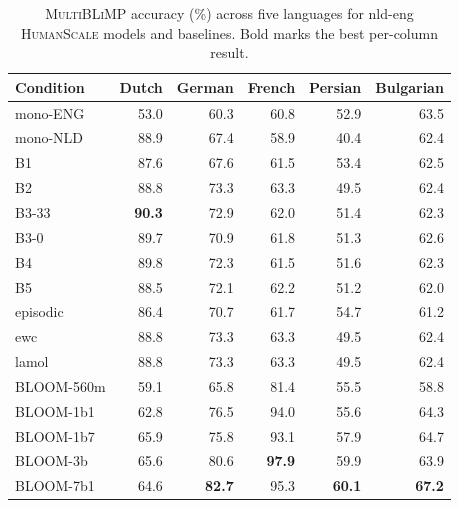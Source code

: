 \begin{table}[t]
  \centering
  \small
  \caption{\textsc{MultiBLiMP} accuracy (\%) across five languages for nld-eng \textsc{HumanScale} \beetle{} models and baselines. Bold marks the best per-column result.}
  \label{tab:multiblimp}
  \begin{tabular}{lrrrrr}
    \toprule
    Condition & Dutch & German & French & Persian & Bulgarian \\
    \midrule
    mono-ENG & 53.0 & 60.3 & 60.8 & 52.9 & 63.5 \\
    mono-NLD & 88.9 & 67.4 & 58.9 & 40.4 & 62.4 \\
    B1       & 87.6 & 67.6 & 61.5 & 53.4 & 62.5 \\
    B2       & 88.8 & 73.3 & 63.3 & 49.5 & 62.4 \\
    B3-33    & \textbf{90.3} & 72.9 & 62.0 & 51.4 & 62.3 \\
    B3-0     & 89.7 & 70.9 & 61.8 & 51.3 & 62.6 \\
    B4       & 89.8 & 72.3 & 61.5 & 51.6 & 62.3 \\
    B5       & 88.5 & 72.1 & 62.2 & 51.2 & 62.0 \\
    episodic & 86.4 & 70.7 & 61.7 & 54.7 & 61.2 \\
    ewc      & 88.8 & 73.3 & 63.3 & 49.5 & 62.4 \\
    lamol    & 88.8 & 73.3 & 63.3 & 49.5 & 62.4 \\
    BLOOM-560m & 59.1 & 65.8 & 81.4 & 55.5 & 58.8 \\
    BLOOM-1b1  & 62.8 & 76.5 & 94.0 & 55.6 & 64.3 \\
    BLOOM-1b7  & 65.9 & 75.8 & 93.1 & 57.9 & 64.7 \\
    BLOOM-3b   & 65.6 & 80.6 & \textbf{97.9} & 59.9 & 63.9 \\
    BLOOM-7b1  & 64.6 & \textbf{82.7} & 95.3 & \textbf{60.1} & \textbf{67.2} \\
    \bottomrule
  \end{tabular}
\end{table}

